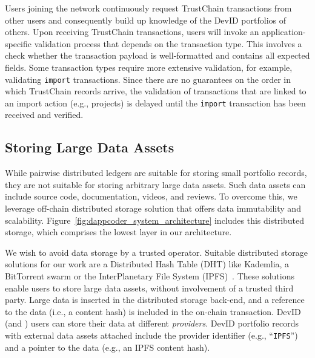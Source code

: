 Users joining the network continuously request TrustChain transactions from other users and consequently build up knowledge of the DevID portfolios of others.
Upon receiving TrustChain transactions, users will invoke an application-specific validation process that depends on the transaction type.
This involves a check whether the transaction payload is well-formatted and contains all expected fields.
Some transaction types require more extensive validation, for example, validating \texttt{import} transactions.
Since there are no guarantees on the order in which TrustChain records arrive, the validation of transactions that are linked to an import action (e.g., projects) is delayed until the \texttt{import} transaction has been received and verified.

\subsection{Storing Large Data Assets}
While pairwise distributed ledgers are suitable for storing small portfolio records, they are not suitable for storing arbitrary large data assets.
Such data assets can include source code, documentation, videos, and reviews.
To overcome this, we leverage off-chain distributed storage solution that offers data immutability and scalability.
Figure~\ref{fig:dappcoder_system_architecture} includes this distributed storage, which comprises the lowest layer in our architecture.

We wish to avoid data storage by a trusted operator.
Suitable distributed storage solutions for our work are a Distributed Hash Table (DHT) like Kademlia, a BitTorrent swarm or the InterPlanetary File System (IPFS)~\cite{maymounkov2002kademlia,cohen2008bittorrent,benet2014ipfs}.
These solutions enable users to store large data assets, without involvement of a trusted third party.
Large data is inserted in the distributed storage back-end, and a reference to the data (i.e., a content hash) is included in the on-chain transaction.
DevID (and \Dappcoder{}) users can store their data at different \emph{providers}.
DevID portfolio records with external data assets attached include the provider identifier (e.g., \enquote{\texttt{IPFS}}) and a pointer to the data (e.g., an IPFS content hash).

